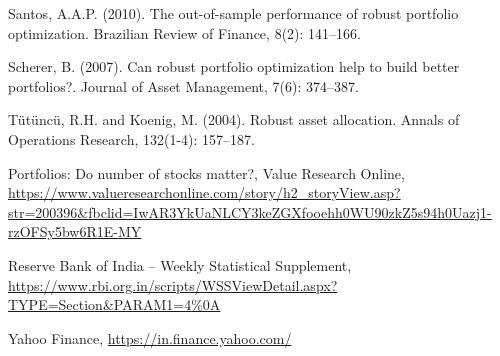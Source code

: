 \documentclass[12pt]{article}
\numberwithin{equation}{section}
\begin{document}
\begin{thebibliography}{plain}
Santos, A.A.P. (2010).
The out-of-sample performance of robust portfolio optimization.
Brazilian Review of Finance, 8(2): 141--166.

 Scherer, B. (2007).
Can robust portfolio optimization help to build better portfolios?.
Journal of Asset Management, 7(6): 374--387.

 T{\"u}t{\"u}nc{\"u}, R.H. and Koenig, M. (2004).
Robust asset allocation.
Annals of Operations Research, 132(1-4): 157--187.

Portfolios: Do number of stocks matter?, Value Research Online,
{\url{https://www.valueresearchonline.com/story/h2_storyView.asp?str=200396&fbclid=IwAR3YkUaNLCY3keZGXfooehh0WU90zkZ5s94h0Uazj1-rzOFSy5bw6R1E-MY}}

Reserve Bank of India -- Weekly Statistical Supplement,
{\url{https://www.rbi.org.in/scripts/WSSViewDetail.aspx?TYPE=Section&PARAM1=4\%0A}}

Yahoo Finance,
{\url{https://in.finance.yahoo.com/}}

\end{thebibliography}

\newpage
\end{document}
